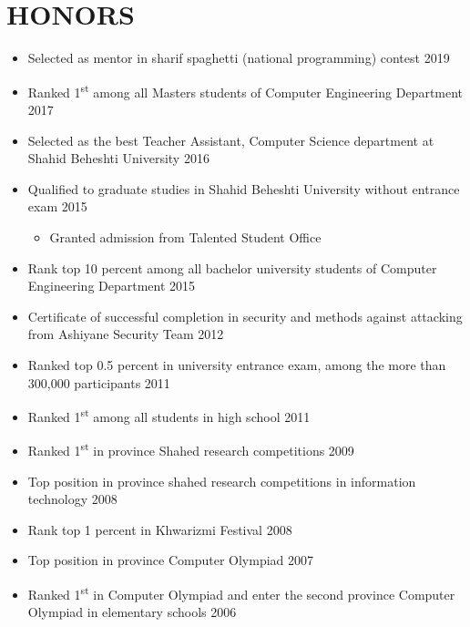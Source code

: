 \documentclass[10pt,a4paper,sans]{moderncv} %
\begin{document}
	\section{HONORS}
	\begin{itemize}
		\item Selected as mentor in sharif spaghetti (national programming) contest \hfill 2019

		\item Ranked 1\textsuperscript{st} among all Masters students of Computer Engineering Department \hfill 2017
		
		\item Selected as the best Teacher Assistant, Computer Science department at Shahid Beheshti University \hfill 2016
		
		\item Qualified to graduate studies in Shahid Beheshti University without entrance exam \hfill 2015		
		\begin{itemize}
			\item Granted admission from Talented Student Office
		\end{itemize}

		\item Rank top 10 percent  among all bachelor university students of Computer Engineering Department  \hfill 2015	
		
		\item Certificate of successful completion in  security and methods against attacking from Ashiyane Security Team \hfill 2012 
		
		\item Ranked top 0.5 percent  in university entrance exam, among the more than 300,000 participants \hfill 2011 
		
		\item Ranked 1\textsuperscript{st} among all students in high school \hfill 2011

		\item Ranked 1\textsuperscript{st} in province Shahed research competitions \hfill 2009
		
		\item Top position in province shahed research competitions in information technology \hfill 2008 

		\item Rank top 1 percent in Khwarizmi Festival  \hfill 2008 
		
		\item Top position in province Computer Olympiad \hfill 2007 

		\item Ranked 1\textsuperscript{st} in Computer Olympiad and enter the second province Computer Olympiad in elementary schools \hfill 2006
	\end{itemize}
	
\end{document}
